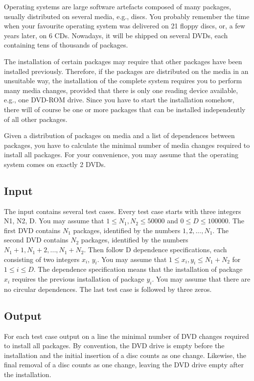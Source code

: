 Operating systems are large software artefacts composed of many packages, usually
distributed on several media, e.g., discs. You probably remember the time when your
favourite operating system was delivered on 21 floppy discs, or, a few years later,
on 6 CDs. Nowadays, it will be shipped on several DVDs, each containing tens of
thousands of packages.

The installation of certain packages may require that other packages have been
installed previously. Therefore, if the packages are distributed on the media in
an unsuitable way, the installation of the complete system requires you to perform
many media changes, provided that there is only one reading device available,
e.g., one DVD-ROM drive. Since you have to start the installation somehow, there
will of course be one or more packages that can be installed independently of all
other packages.

Given a distribution of packages on media and a list of dependences between
packages, you have to calculate the minimal number of media changes required
to install all packages. For your convenience, you may assume that the operating
system comes on exactly 2 DVDs.

\subsection*{Input}

The input contains several test cases. Every test case starts with three
integers N1, N2, D. You may assume that $1 \leq N_1 , N_2 \leq 50000$ and
$0 \leq D \leq 100000$.
The first DVD contains $N_1$ packages, identified by the numbers $1, 2, ..., N_1$.
The second DVD contains $N_2$ packages, identified by the numbers
$N_1+1, N_1+2, ..., N_1+N_2$. Then follow D dependence specifications, each
consisting of two integers $x_i$, $y_i$. You may assume that $1 \leq x_i,y_i \leq N_1+N_2$
for $1 \leq i \leq D$. The dependence specification means that the installation of
package $x_i$ requires the previous installation of package $y_i$. You may assume
that there are no circular dependences. The last test case is followed
by three zeros.

\subsection*{Output}

For each test case output on a line the minimal number of DVD changes
required to install all packages. By convention, the DVD drive is empty
before the installation and the initial insertion of a disc counts as one
change. Likewise, the final removal of a disc counts as one change,
leaving the DVD drive empty after the installation.

